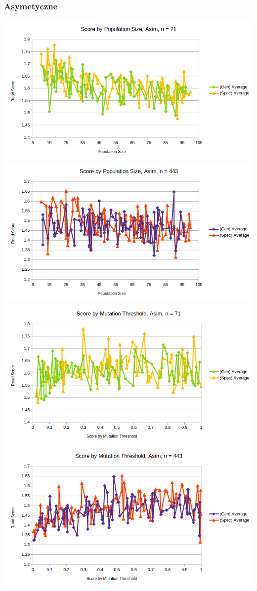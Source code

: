 \documentclass{article}
\begin{document}
\subsubsection*{Asymetyczne}
\includegraphics[scale=0.36]{pSAsim71}
\includegraphics[scale=0.36]{pSAsim443}
\includegraphics[scale=0.36]{mTAsim71}
\includegraphics[scale=0.36]{mTAsim443}
\end{document}
